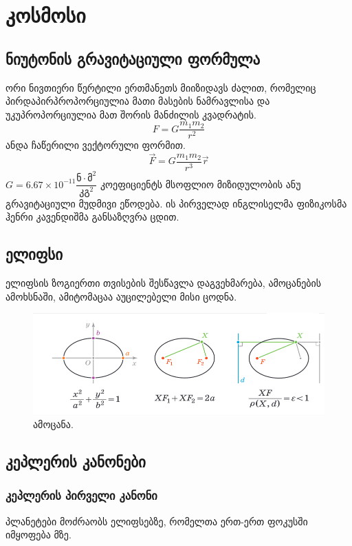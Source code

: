 \documentclass[a4paper]{book}
\begin{document}
\section{კოსმოსი}
\subsection{ნიუტონის გრავიტაციული ფორმულა}
ორი ნივთიერი წერტილი ერთმანეთს მიიზიდავს ძალით, რომელიც პირდაპირპროპორციულია მათი მასების ნამრავლისა და უკუპროპორციულია მათ შორის მანძილის კვადრატის.
	\begin{equation}
		F = G\frac{m_1 m_2}{r^2}
	\end{equation}
ანდა ჩაწერილი ვექტორული ფორმით.
	\begin{equation}
		\vec{F} = G\frac{m_1 m_2}{r^3}\vec{r}
	\end{equation}
$G = 6.67 \times 10^{-11} \dfrac{\text{ნ}\cdot\text{მ}^2}{\text{კგ}^2}$ კოეფიციენტს მსოფლიო მიზიდულობის ანუ გრავიტაციული მუდმივი ეწოდება.
ის პირველად ინგლისელმა ფიზიკოსმა ჰენრი კავენდიშმა განსაზღვრა ცდით.

\subsection{ელიფსი}%
ელიფსის ზოგიერთი თვისების შესწავლა დაგვეხმარება, ამოცანების ამოხსნაში, ამიტომაცაა აუცილებელი მისი ცოდნა.
	\begin{figure}[H]
	\centering
    \includegraphics[width=0.9\columnwidth]{figures/ellipse}
    \caption{ამოცანა.}
    \label{fig:statics_1}
    \end{figure}


\subsection{კეპლერის კანონები}%
\subsubsection{კეპლერის პირველი კანონი}
	პლანეტები მოძრაობს ელიფსებზე, რომელთა ერთ-ერთ ფოკუსში იმყოფება მზე.
\end{document}
